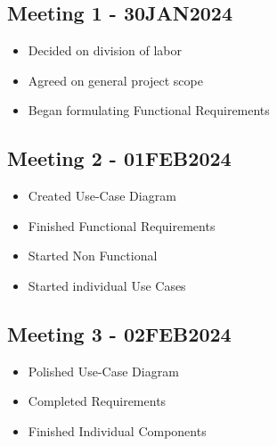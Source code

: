 \documentclass[11pt]{article}
\begin{document}
\subsection*{Meeting 1 - 30JAN2024}
\label{sec:orgfd3e0cd}
\begin{itemize}
\item Decided on division of labor
\item Agreed on general project scope
\item Began formulating Functional Requirements
\end{itemize}
\subsection*{Meeting 2 - 01FEB2024}
\label{sec:org6167109}
\begin{itemize}
\item Created Use-Case Diagram
\item Finished Functional Requirements
\item Started Non Functional
\item Started individual Use Cases
\end{itemize}
\subsection*{Meeting 3 - 02FEB2024}
\label{sec:orga09bea0}
\begin{itemize}
\item Polished Use-Case Diagram
\item Completed Requirements
\item Finished Individual Components
\end{itemize}
\end{document}
